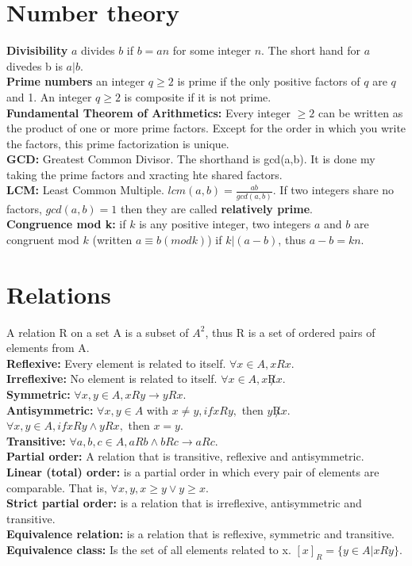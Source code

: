 \documentclass[a4paper]{article}
\begin{document}
\section{Number theory}
{\bf Divisibility} $a$ divides $b$ if $b=an$ for some integer $n$. The short hand for $a$ divedes b is $ a|b$.\\
{\bf Prime numbers} an integer $q \geq 2$ is prime if the only positive factors of $q$ are $q$ and 1. An integer $q\geq 2$ is composite if it is not prime.\\

{\bf Fundamental Theorem of Arithmetics:} Every integer $\geq 2$ can be written as the product of one or more prime factors. Except for the order in which you write the factors, this prime factorization is unique.\\
{\bf GCD:} Greatest Common Divisor. The shorthand is gcd(a,b). It is done my taking the prime factors and xracting hte shared factors.\\
{\bf LCM:} Least Common Multiple. $lcm(a,b)=\frac{ab}{gcd(a,b)}$. If two integers share no factors, $gcd(a,b)=1$ then they are called {\bf relatively prime}.\\

{\bf Congruence mod k:} if $k$ is any positive integer, two integers $a$ and $b$ are congruent mod $k$ (written $a \equiv b (mod k)$) if $k|(a-b)$, thus $a-b=kn$.

\section{Relations}
A relation R on a set A is a subset of $A^2$, thus R is a set of ordered pairs of elements from A.\\
{\bf Reflexive:} Every element is related to itself. $\forall x\in A, xRx $.\\
{\bf Irreflexive:} No element is related to itself. $\forall x\in A, x\not R x$.\\
{\bf Symmetric:} $\forall x,y \in A, xRy \rightarrow yRx$.\\
{\bf Antisymmetric:} $\forall x,y \in A$ with $x \neq y, if xRy,$ then $y \not R x$.\\
$\forall x,y \in A, if xRy \wedge yRx,$ then $ x=y$.\\
{\bf Transitive:} $\forall a,b,c \in A, aRb \wedge bRc \rightarrow aRc$.\\
{\bf Partial order:} A relation that is transitive, reflexive and antisymmetric.\\
{\bf Linear (total) order:} is a partial order in which every pair of elements are comparable. That is, $\forall x,y, x\geq y \vee y\geq x$.\\
{\bf Strict partial order:} is a relation that is irreflexive, antisymmetric and transitive.\\
{\bf Equivalence relation:} is a relation that is reflexive, symmetric and transitive.\\
{\bf Equivalence class:} Is the set of all elements related to x. $[x]_R=\{y \in A | xRy\}$.\\
\end{document}
